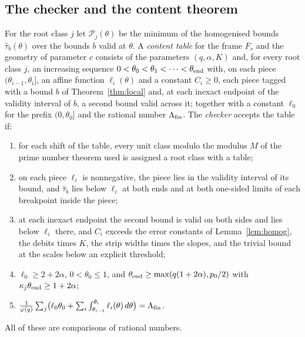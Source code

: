 \documentclass[11pt]{amsart}
\theoremstyle{definition}
\theoremstyle{remark}
\numberwithin{equation}{section}
\begin{document}
\subsection{The checker and the content theorem}\label{ssec:checker}
For the root class $j$ let $\mathcal P_j(\theta)$ be the minimum of the homogenised bounds $\hat\tau_b(\theta)$ over the
bounds $b$ valid at $\theta$. A \emph{content table} for the frame $F_s$ and the geometry of parameter $c$ consists of the parameters $(q,\alpha,K)$
and, for every root class $j$, an increasing sequence $0<\theta_0<\theta_1<\dots<\theta_{\rm end}$ with, on each piece
$(\theta_{i-1},\theta_i]$, an affine function $\ell_i(\theta)$ and a constant $C_i\ge0$, each piece tagged with a bound $b$ of
Theorem~\ref{thm:local} and, at each inexact endpoint of the validity interval of $b$, a second bound valid across it;
together with a constant $\ell_0$ for the prefix $(0,\theta_0]$ and the rational number $\Lambda_{\rm fin}$. The
\emph{checker} accepts the table if:
\begin{enumerate}[label=(C\arabic*),leftmargin=*]
\item for each shift of the table, every unit class modulo the modulus $M$ of the prime number theorem used is assigned a
 root class with a table;
\item on each piece $\ell_i$ is nonnegative, the piece lies in the validity interval of its bound, and $\hat\tau_b$ lies
 below $\ell_i$ at both ends and at both one-sided limits of each breakpoint inside the piece;
\item at each inexact endpoint the second bound is valid on both sides and lies below $\ell_i$ there, and $C_i$ exceeds
 the error constants of Lemma~\ref{lem:homog}, the debits times $K$, the strip widths times the slopes, and the trivial
 bound at the scales below an explicit threshold;
\item $\ell_0\ge2+2\alpha$, $0<\theta_0\le1$, and $\theta_{\rm end}\ge\max(q(1+2\alpha),p_0/2)$ with
 $\kappa_j\theta_{\rm end}\ge1+2\alpha$;
\item $\frac1{\varphi(q)}\sum_j\bigl(\ell_0\theta_0+\sum_i\int_{\theta_{i-1}}^{\theta_i}\ell_i(\theta)\,d\theta\bigr)=\Lambda_{\rm fin}$.
\end{enumerate}
All of these are comparisons of rational numbers.
\end{document}
